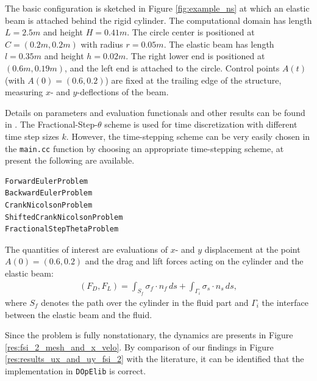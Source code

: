 \documentclass[prodmode,acmtoms]{acmsmall}
\numberwithin{equation}{section}
\newcommand{\dope}{\texttt{DOpElib}}
\begin{document}
The basic configuration is 
sketched in Figure \ref{fig:example_ns} at which an elastic beam is attached 
behind the rigid cylinder. 
The computational domain has length $L=2.5m$ and height $H=0.41m$. The circle center
is positioned at $C=(0.2m,0.2m)$ with radius $r=0.05m$. The elastic beam has length
$l=0.35m$ and height $h=0.02m$. The right lower end is positioned at 
$(0.6m,0.19m)$, and
the left end is attached to the circle. 
Control points $A(t)$ (with $A(0) = (0.6,0.2)$) are fixed at the 
trailing edge of the structure, measuring $x$- and $y$-deflections of the beam.

Details 
on parameters and evaluation functionals and other results 
can be found in \cite{HrTu06b,BuSc06,DeHaeAnnBrVie10,Wi11}. 
The Fractional-Step-$\theta$ scheme is used for time discretization with
different time step sizes $k$. However, the time-stepping scheme can be 
very easily chosen in the \texttt{main.cc} function by choosing an appropriate 
time-stepping scheme, at present the following are available.
\begin{lstlisting}
ForwardEulerProblem
BackwardEulerProblem
CrankNicolsonProblem
ShiftedCrankNicolsonProblem
FractionalStepThetaProblem
\end{lstlisting}

The quantities of interest are evaluations of 
$x$- and $y$ displacement at the point $A(0) = (0.6,0.2)$
and the drag and lift forces acting on the cylinder and the elastic beam:
\begin{align}
\label{drag_lift_forces}
(F_D , F_L) 
= {\int_{S_f} \sigma_f \cdot n_f \, ds + 
\int_{\Gamma_i} \sigma_s \cdot n_s \, ds},
\end{align}
where $S_{f}$ denotes the path over the cylinder in the fluid part and
$\Gamma_i$ the interface between the elastic beam and the 
fluid.

Since the problem is fully nonstationary, the 
dynamics are presents in Figure \ref{res:fsi_2_mesh_and_x_velo}. 
By comparison of our findings in Figure \ref{res:results_ux_and_uy_fsi_2}
with the literature, it can be identified that 
the implementation in \dope{} is correct.
\end{document}
